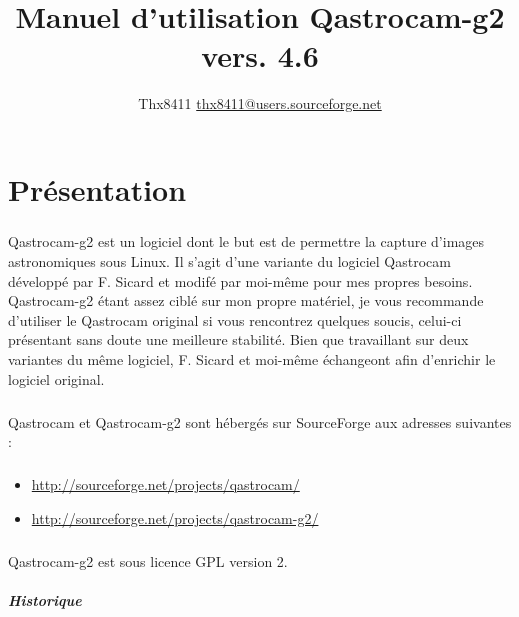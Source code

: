 \documentclass[11pt,a4paper]{book}
\title{Manuel d'utilisation Qastrocam-g2 vers. 4.6}
\author{Thx8411 \url{thx8411@users.sourceforge.net}}
\begin{document}
\maketitle

\tableofcontents

\chapter{Pr\'esentation}

\paragraph*{}
Qastrocam-g2 est un logiciel dont le but est de permettre la capture d'images
astronomiques sous Linux. Il s'agit d'une variante du logiciel Qastrocam d\'evelopp\'e
par F. Sicard et modif\'e par moi-m\^eme pour mes propres besoins. Qastrocam-g2 \'etant
assez cibl\'e sur mon propre mat\'eriel, je vous recommande d'utiliser le Qastrocam
original si vous rencontrez quelques soucis, celui-ci pr\'esentant sans doute une
meilleure stabilit\'e. Bien que travaillant sur deux variantes du m\^eme logiciel, F.
Sicard et moi-m\^eme \'echangeont afin d'enrichir le logiciel original.

\paragraph*{}
Qastrocam et Qastrocam-g2 sont h\'eberg\'es sur SourceForge aux adresses suivantes :

\paragraph*{}
\begin{itemize}
\item \url{http://sourceforge.net/projects/qastrocam/}
\item \url{http://sourceforge.net/projects/qastrocam-g2/}
\end{itemize}

\paragraph*{}
Qastrocam-g2 est sous licence GPL version 2.

\paragraph*{Historique}
\end{document}
